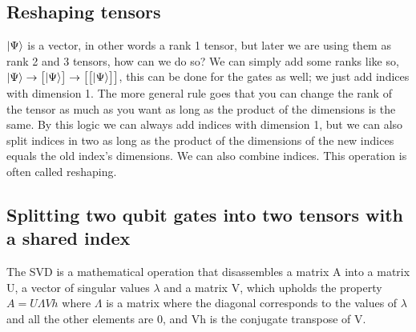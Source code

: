 \subsection{Reshaping tensors }
\noindent 
$\ket{\Psi}$ is a vector, in other words a rank 1 tensor, but later we are using them as rank 2 and 3 tensors, how can we do so? We can simply add some ranks like so,
$\ket{\Psi} \rightarrow
\begin{bmatrix}
    \ket{\Psi}
\end{bmatrix} \rightarrow
\begin{bmatrix}
    \begin{bmatrix}
        \ket{\Psi}
    \end{bmatrix}
\end{bmatrix}$, this can be done for the gates as well; we just add indices with dimension 1.  
The more general rule goes that you can change the rank of the tensor as much as you want as long as the product of the dimensions is the same. By this logic we can always add indices with dimension 1, but we can also split indices in two as long as the product of the dimensions of the new indices equals the old index's dimensions. We can also combine indices. This operation is often called reshaping.  

\subsection{Splitting two qubit gates into two tensors with a shared index }
The SVD\cite{SVD} is a mathematical operation that disassembles a matrix A into a matrix U, a vector of singular values $\lambda$ and a matrix V, which upholds the property $A=U\Lambda Vh$ where $\Lambda$ is a matrix where the diagonal corresponds to the values of $\lambda$ and all the other elements are 0, and Vh is the conjugate transpose of V. 


